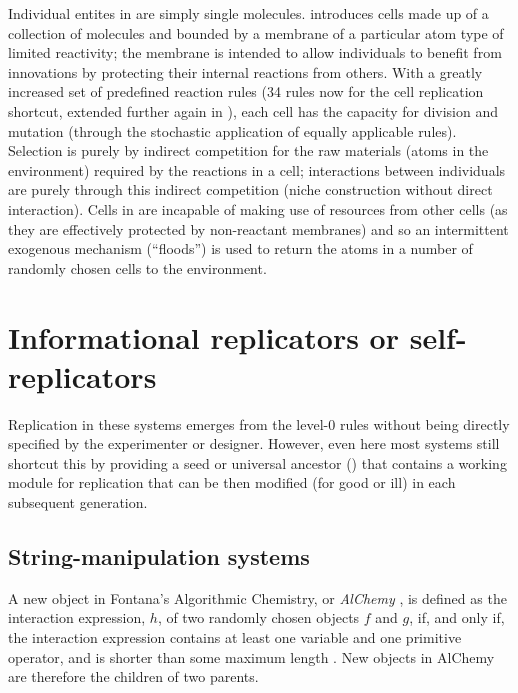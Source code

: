 Individual entites in \cite{Hutton2002} are simply single molecules. \Cite{Hutton2007} introduces cells made up of a collection of molecules and bounded by a membrane of a particular atom type of limited reactivity; the membrane is intended to allow individuals to benefit from innovations by protecting their internal reactions from others. With a greatly increased set of predefined reaction rules (34 rules now for the cell replication shortcut, extended further again in \cite{Lucht2012}), each cell has the capacity for division and mutation (through the stochastic application of equally applicable rules).  Selection is purely by indirect competition for the raw materials (atoms in the environment) required by the reactions in a cell; interactions between individuals are purely through this indirect competition (niche construction without direct interaction). Cells in \cite{Hutton2007} are incapable of making use of resources from other cells (as they are effectively protected by non-reactant membranes) and so an intermittent exogenous mechanism (``floods'') is used to return the atoms in a number of randomly chosen cells to the environment.

\section{Informational replicators or self-replicators}
\begin{NOTES}
Replication in these systems emerges from the level-0 rules without being directly specified by the experimenter or designer. However, even here most systems still shortcut this by providing a seed or universal ancestor (\eg \cite{Ofria2004}) that contains a working module for replication that can be then modified (for good or ill) in each subsequent generation.
\end{NOTES}
\subsection{String-manipulation systems}

A new object in Fontana's Algorithmic Chemistry, or \emph{AlChemy} \parencite{Fontana1992}, is defined as the interaction expression, $h$, of two randomly chosen objects $f$ and $g$, if, and only if, the interaction expression contains at least one variable and one primitive operator, and is shorter than some maximum length \parencite[p.173--p.180]{Fontana1992}. New objects in AlChemy are therefore the children of two parents.

